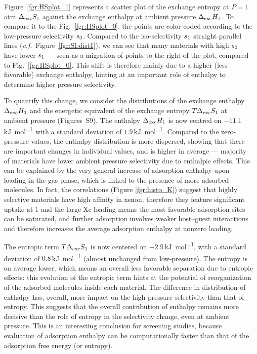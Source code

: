 \documentclass[main.tex]{subfiles}
\begin{document}
  Figure~\ref{fgr:HSplot_1} represents a scatter plot of the exchange entropy at $P = 1$\,atm $\Delta_{\text{exc}}S_{\text{1}}$ against the exchange enthalpy at ambient pressure $\Delta_{\text{exc}}H_{\text{1}}$. To compare it to the Fig.~\ref{fgr:HSplot_0}, the points are color-coded according to the low-pressure selectivity $s_{\text{0}}$. Compared to the iso-selectivity $s_{\text{1}}$ straight parallel lines (\emph{c.f.}~Figure~\ref{fgr:SI:dist1}), we can see that many materials with high $s_{\text{0}}$ have lower $s_{\text{1}}$ --- seen as a migration of points to the right of the plot, compared to Fig.~\ref{fgr:HSplot_0}. This shift is therefore mainly due to a higher (less favorable) exchange enthalpy, hinting at an important role of enthalpy to determine higher pressure selectivity.
  
  To quantify this change, we consider the distributions of the exchange enthalpy $\Delta_{\text{exc}}H_{\text{1}}$ and the energetic equivalent of the exchange entropy $T\Delta_{\text{exc}}S_{\text{1}}$ at ambient pressure (Figures~S9). The enthalpy $\Delta_{\text{exc}}H_{\text{1}}$ is now centred on $-11.1$\,\si{\kilo\joule\per\mol} with a standard deviation of $1.9$\,\si{\kilo\joule\per\mol}. Compared to the zero-pressure values, the enthalpy distribution is more dispersed, showing that there are important changes in individual values, and is higher in average --- majority of materials have lower ambient pressure selectivity due to enthalpic effects. This can be explained by the very general increase of adsorption enthalpy upon loading in the gas phase, which is linked to the presence of more adsorbed molecules. In fact, the correlations (Figure \ref{fgr:histo_K}) suggest that highly selective materials have high affinity in xenon, therefore they feature significant uptake at \SI{1}{\atm} and the large Xe loading means the most favorable adsorption sites can be saturated, and further adsorption involves weaker host--guest interactions and therefore increases the average adsorption enthalpy at nonzero loading.
  
  The entropic term $T\Delta_{\text{exc}}S_{\text{1}}$ is now centered on $-2.9$\,\si{\kilo\joule\per\mol}, with a standard deviation of $0.8$\,\si{\kilo\joule\per\mol} (almost unchanged from low-pressure). The entropy is on average lower, which means an overall less favorable separation due to entropic effects: this evolution of the entropic term hints at the potential of reorganization of the adsorbed molecules inside each material. The difference in distribution of enthalpy has, overall, more impact on the high-pressure selectivity than that of entropy. This suggests that the overall contribution of enthalpy remains more decisive than the role of entropy in the selectivity change, even at ambient pressure. This is an interesting conclusion for screening studies, because evaluation of adsorption enthalpy can be computationally faster than that of the adsorption free energy (or entropy).
\end{document}
